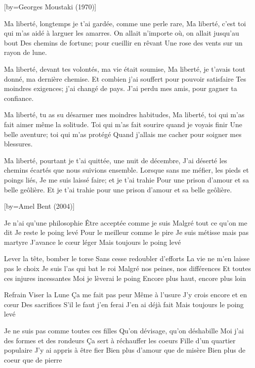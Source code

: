[by={Georges Moustaki (1970)}]

\beginverse
Ma liberté, longtemps je t'ai gardée, comme une perle rare,
Ma liberté, c'est toi qui m'as aidé à larguer les amarres.
On allait n'importe où, on allait jusqu'au bout
Des chemins de fortune; pour cueillir en rêvant
Une rose des vents sur un rayon de lune.
\endverse

\beginverse
Ma liberté, devant tes volontés, ma vie était soumise,
Ma liberté, je t'avais tout donné, ma dernière chemise.
Et combien j'ai souffert pour pouvoir satisfaire
Tes moindres exigences; j'ai changé de pays.
J'ai perdu mes amis, pour gagner ta confiance.
\endverse

\beginverse
Ma liberté, tu as su désarmer mes moindres habitudes,
Ma liberté, toi qui m'as fait aimer même la solitude.
Toi qui m'as fait sourire quand je voyais finir
Une belle aventure; toi qui m'as protégé
Quand j'allais me cacher pour soigner mes blessures.
\endverse

\beginverse
Ma liberté, pourtant je t'ai quittée, une nuit de décembre,
J'ai déserté les chemins écartés que nous suivions ensemble.
Lorsque sans me méfier, les pieds et poings liés,
Je me suis laissé faire; et je t'ai trahie
Pour une prison d'amour et sa belle geôlière.
Et je t'ai trahie pour une prison d'amour et sa belle geôlière.
\endverse

[by={Amel Bent (2004)}]

\beginverse
Je n'ai qu'une philosophie
Être acceptée comme je suis
Malgré tout ce qu'on me dit
Je reste le poing levé
Pour le meilleur comme le pire
Je suis métisse mais pas martyre
J'avance le cœur léger
Mais toujours le poing levé
\endverse

\beginverse
Lever la tête, bomber le torse
Sans cesse redoubler d'efforts
La vie ne m'en laisse pas le choix
Je suis l'as qui bat le roi
Malgré nos peines, nos différences
Et toutes ces injures incessantes
Moi je lèverai le poing
Encore plus haut, encore plus loin
\endverse

\beginverse
Refrain
Viser la Lune
Ça me fait pas peur
Même à l'usure
J'y crois encore et en cœur
Des sacrifices
S'il le faut j'en ferai
J'en ai déjà fait
Mais toujours le poing levé
\endverse

\beginverse
Je ne suis pas comme toutes ces filles
Qu'on dévisage, qu'on déshabille
Moi j'ai des formes et des rondeurs
Ça sert à réchauffer les coeurs
Fille d'un quartier populaire
J'y ai appris à être fier
Bien plus d'amour que de misère
Bien plus de coeur que de pierre
\endverse

